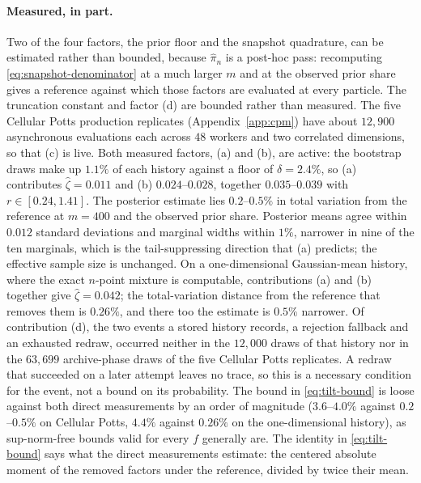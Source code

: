 \documentclass[10pt]{article}
\theoremstyle{plain}
\theoremstyle{definition}
\begin{document}
\paragraph{Measured, in part.} Two of the four factors, the prior floor and the snapshot quadrature, can be estimated rather than bounded, because $\widehat\pi_n$ is a post-hoc pass: recomputing \eqref{eq:snapshot-denominator} at a much larger $m$ and at the observed prior share gives a reference against which those factors are evaluated at every particle. The truncation constant and factor (d) are bounded rather than measured. The five Cellular Potts production replicates (Appendix~\ref{app:cpm}) have about $12{,}900$ asynchronous evaluations each across $48$ workers and two correlated dimensions, so that (c) is live. Both measured factors, (a) and (b), are active: the bootstrap draws make up $1.1\%$ of each history against a floor of $\delta=2.4\%$, so (a) contributes $\widehat\zeta=0.011$ and (b) $0.024$--$0.028$, together $0.035$--$0.039$ with $r\in[0.24,1.41]$. The posterior estimate lies $0.2$--$0.5\%$ in total variation from the reference at $m=400$ and the observed prior share. Posterior means agree within $0.012$ standard deviations and marginal widths within $1\%$, narrower in nine of the ten marginals, which is the tail-suppressing direction that (a) predicts; the effective sample size is unchanged. On a one-dimensional Gaussian-mean history, where the exact $n$-point mixture is computable, contributions (a) and (b) together give $\widehat\zeta=0.042$; the total-variation distance from the reference that removes them is $0.26\%$, and there too the estimate is $0.5\%$ narrower. Of contribution (d), the two events a stored history records, a rejection fallback and an exhausted redraw, occurred neither in the $12{,}000$ draws of that history nor in the $63{,}699$ archive-phase draws of the five Cellular Potts replicates. A redraw that succeeded on a later attempt leaves no trace, so this is a necessary condition for the event, not a bound on its probability. The bound in \eqref{eq:tilt-bound} is loose against both direct measurements by an order of magnitude ($3.6$--$4.0\%$ against $0.2$--$0.5\%$ on Cellular Potts, $4.4\%$ against $0.26\%$ on the one-dimensional history), as sup-norm-free bounds valid for every $f$ generally are. The identity in \eqref{eq:tilt-bound} says what the direct measurements estimate: the centered absolute moment of the removed factors under the reference, divided by twice their mean.
\end{document}
